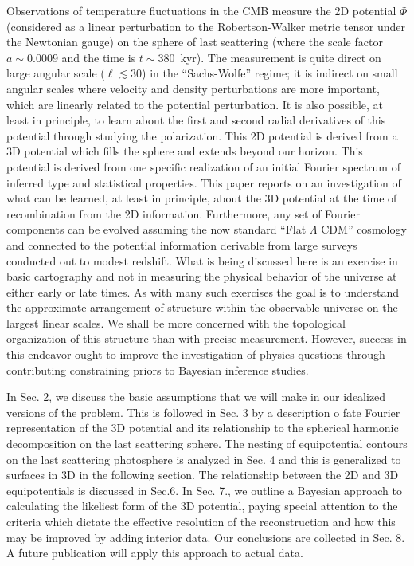 \documentclass[useAMS,usenatbib,a4paper]{mn2e}
\begin{document}
Observations of temperature fluctuations in the CMB measure the 2D
potential $\Phi$ (considered as a linear perturbation to the
Robertson-Walker metric tensor under the Newtonian gauge) on the
sphere of last scattering (where the scale factor $a\sim0.0009$ and
the time is $t\sim380$~kyr). The measurement is quite direct on large
angular scale ($\ell\lesssim30$) in the ``Sachs-Wolfe'' regime; it is
indirect on small angular scales where velocity and density
perturbations are more important, which are linearly related to the
potential perturbation. It is also possible, at least in principle, to
learn about the first and second radial derivatives of this potential
through studying the polarization. This 2D potential is derived from a
3D potential which fills the sphere and extends beyond our horizon.
This potential is derived from one specific realization of an initial
Fourier spectrum of inferred type and statistical properties.  This
paper reports on an investigation of what can be learned, at least in
principle, about the 3D potential at the time of recombination from
the 2D information. Furthermore, any set of Fourier components can be
evolved assuming the now standard ``Flat $\Lambda$ CDM'' cosmology and
connected to the potential information derivable from large surveys
conducted out to modest redshift. What is being discussed here is an
exercise in basic cartography and not in measuring the physical
behavior of the universe at either early or late times. As with many
such exercises the goal is to understand the approximate arrangement
of structure within the observable universe on the largest linear
scales. We shall be more concerned with the topological organization
of this structure than with precise measurement. However, success in
this endeavor ought to improve the investigation of physics questions
through contributing constraining priors to Bayesian inference
studies.

In Sec. 2, we discuss the basic assumptions that we will make in our
idealized versions of the problem. This is followed in Sec. 3 by a
description o fate Fourier representation of the 3D potential and its
relationship to the spherical harmonic decomposition on the last
scattering sphere. The nesting of equipotential contours on the last
scattering photosphere is analyzed in Sec. 4 and this is generalized
to surfaces in 3D in the following section.  The relationship between
the 2D and 3D equipotentials is discussed in Sec.6. In Sec. 7., we
outline a Bayesian approach to calculating the likeliest form of the
3D potential, paying special attention to the criteria which dictate
the effective resolution of the reconstruction and how this may be
improved by adding interior data. Our conclusions are collected in
Sec. 8. A future publication will apply this approach to actual data.
\end{document}
